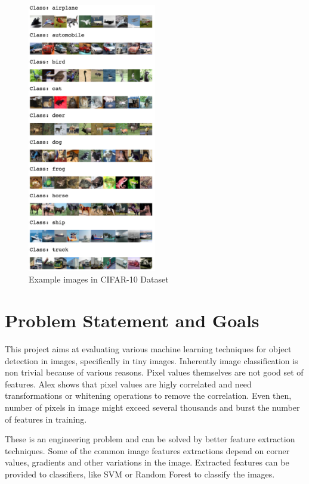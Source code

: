 \documentclass[12pt]{article}
\begin{document}
\begin{figure}[H]
\centering
\includegraphics[width=0.5\textwidth]{images/dataset.png} 
\caption{Example images in CIFAR-10 Dataset}
\label{img:dataset}
\end{figure}

\section{Problem Statement and Goals}
This project aims at evaluating various machine learning techniques for object detection in images, specifically in tiny images. Inherently image classification is non trivial because of various reasons. Pixel values themselves are not good set of features. Alex \cite{ref:dataset} shows that pixel values are higly correlated and need transformations or whitening operations to remove the correlation. Even then, number of pixels in image might exceed several thousands and burst the number of features in training.

These is an engineering problem and can be solved by better feature extraction techniques. Some of the common image features extractions depend on corner values, gradients and other variations in the image. Extracted features can be provided to classifiers, like SVM or Random Forest to classify the images. 
\end{document}
